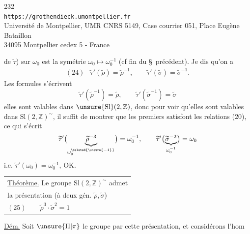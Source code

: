 
\begin{center}
232\\
\texttt{https://grothendieck.umontpellier.fr}\\
Université de Montpellier, UMR CNRS 5149, Case courrier 051, Place Eugène Bataillon\\
34095 Montpellier cedex 5 - France
\end{center}


de $\widetilde\tau$) sur $\omega_0$ est la symétrie $\omega_0\mapsto\omega_0^{-1}$ (cf fin du \S\ précédent). Je dis qu'on a
\[
\begin{array}{ll}
(24)&\widetilde\tau'(\widetilde\rho)=\widetilde\rho^{-1},\qquad
\widetilde\tau'(\widetilde\sigma)=\widetilde\sigma^{-1}.
\end{array}
\]
Les formules s'écrivent 
\[
\widetilde\tau'(\widetilde\rho^{-1})=\widetilde\rho,\qquad
\widetilde\tau'(\widetilde\sigma^{-1})=\widetilde\sigma
\]
elles sont valables  dans $\unsure{\mathrm{Sl}}(2,\mathbb Z)$, donc pour voir qu'elles sont valables dans $\mathrm{Sl}(2,\mathbb Z)^{\sim}$, il suffit de montrer que les premiers  satisfont les relations  (20), ce qui s'écrit
\[
\widetilde\tau'\bigl(\underbrace{\widetilde\rho^{-3}}_{\omega_0^{\deleted{\unsure{-1}}}}\bigr)=\omega_0^{-1},\qquad
\widetilde\tau'\bigl(\underbrace{\widetilde\sigma^{-2}}_{\omega_0^{-1}}\bigr)=\omega_0
\]
i.e. $\widetilde\tau'(\omega_0)=\omega_0^{-1}$, OK.

\begin{tabular}{|l}
\uline{Théorème.} Le groupe $\mathrm{Sl}(2,\mathbb Z)^{\sim}$ admet\\
la présentation (à deux gén. $\widetilde\rho,\widetilde\sigma$)\\[3pt]
$(25)\qquad\boxed{\widetilde\rho^3\cdot\widetilde\sigma^2=1}$
\end{tabular}

\uline{Dém.} Soit $\unsure{\Pi|\pi}$ le groupe   par cette présentation, et considérons l'hom

